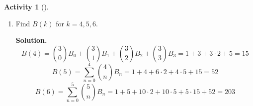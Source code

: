 \documentclass[10pt,]{book}
\theoremstyle{plain}
\theoremstyle{definition}
\newtheorem{activity}[project]{Activity}
\numberwithin{equation}{chapter}
\begin{document}
\begin{activity}[]
\begin{enumerate}[label=(\alph*)]
~\par
\item Find \(B(k)\) for \(k=4,5,6\).%
\par\medskip\noindent%
\textbf{Solution.}\quad %
\begin{equation*}
B(4) ={3\choose 0}B_0 +{3\choose1}B_1 +{3\choose2}B_2 +
{3\choose3}B_3=1 +3+3\cdot2 +5=15
\end{equation*}
%
\begin{equation*}
B(5) = \sum_{n=0}^4 {4\choose n}B_n = 1 +4+6\cdot2 +4\cdot5 + 15=52
\end{equation*}
%
\begin{equation*}
B(6) = \sum_{n=0}^5 {5\choose n}B_n =1+5 +10\cdot2 +10\cdot 5
+5\cdot 15 +52=203
\end{equation*}

\end{enumerate}
\end{activity}
\typeout{************************************************}
\typeout{************************************************}
\end{document}

